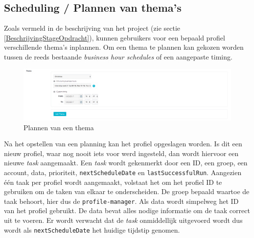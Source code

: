 

\subsection{Scheduling / Plannen van thema's}
Zoals vermeld in de beschrijving van het project (zie sectie \ref{BeschrijvingStageOpdracht}), kunnen gebruikers voor een bepaald profiel verschillende thema's inplannen. Om een thema te plannen kan gekozen worden tussen de reeds bestaande \textit{business hour schedules} of een aangepaste timing. 

\begin{figure}[H]
	\centering
	\includegraphics[width=1\textwidth]{Figuren/ThemeSet.png}
	\caption{Plannen van een thema}
	\label{fig:ThemeSet}
\end{figure}
Na het opstellen van een planning kan het profiel opgeslagen worden. Is dit een nieuw profiel, waar nog nooit iets voor werd ingesteld, dan wordt hiervoor een nieuwe \textit{task} aangemaakt. Een \textit{task} wordt gekenmerkt door een ID, een groep, een account, data, prioriteit, \texttt{nextScheduleDate} en \texttt{lastSuccessfulRun}. Aangezien \'{e}\'{e}n taak per profiel wordt aangemaakt, volstaat het om het profiel ID te gebruiken om de taken van elkaar te onderscheiden. De groep bepaald waartoe de taak behoort, hier dus de \texttt{profile-manager}. Als data wordt simpelweg het ID van het profiel gebruikt. De data bevat alles nodige informatie om de taak correct uit te voeren. Er wordt verwacht dat de \textit{task} onmiddellijk uitgevoerd wordt dus wordt als \texttt{nextScheduleDate} het huidige tijdstip genomen. 

